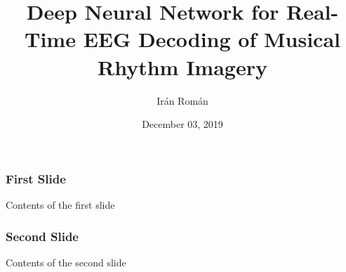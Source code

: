 \documentclass{beamer}
\title{Deep Neural Network for Real-Time EEG Decoding of Musical Rhythm Imagery}
\author{Ir\'{a}n Rom\'{a}n}
\date{December 03, 2019}
\begin{document}
\maketitle

\begin{frame}
	\frametitle{First Slide}
	Contents of the first slide
\end{frame}

\begin{frame}
	\frametitle{Second Slide}
	Contents of the second slide
\end{frame}
\end{document}

